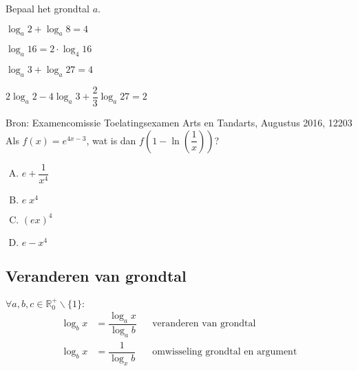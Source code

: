\documentclass[12pt,twoside,a4paper]{article}
\begin{document}
\begin{oefening} %
Bepaal het grondtal $a$.
\begin{exlist}{2}
  \item $\log_a 2 + \log_a 8 = 4$
  \item $\log_a 16 = 2\cdot \log_4 16$
  \item $\log_a 3 + \log_a 27 = 4$
  \item $2 \log_a 2 - 4 \log_a 3 + \dfrac{2}{3}\log_a 27 = 2$
\end{exlist}
\end{oefening}

\begin{oefening}{\scriptsize Bron: Examencomissie Toelatingsexamen Arts en Tandarts, Augustus 2016, 12203}\\
Als $\displaystyle f(x)=e^{4x-3}$, wat is dan $\displaystyle f\left(1-\ln\left(\dfrac{1}{x}\right)\right)$?
\begin{enumerate}[(A)]
  \itemsep1em
  \item $e+\dfrac{1}{x^4}$
  \item $e\;x^4$
  \item $(ex)^4$
  \item $e-x^4$
\end{enumerate}
\end{oefening}

\subsection{Veranderen van grondtal}

\begin{mdframed}
$\forall a,b,c \in \mathbb{R}_0^+\backslash\{1\}:$
\begin{align*}
\log_b x &= \dfrac{\log_a x}{\log_a b} && \mbox{veranderen van grondtal}\\
\log_b x &= \dfrac{1}{\log_x b} && \mbox{omwisseling grondtal en argument}
\end{align*}
\end{mdframed}
\end{document}
